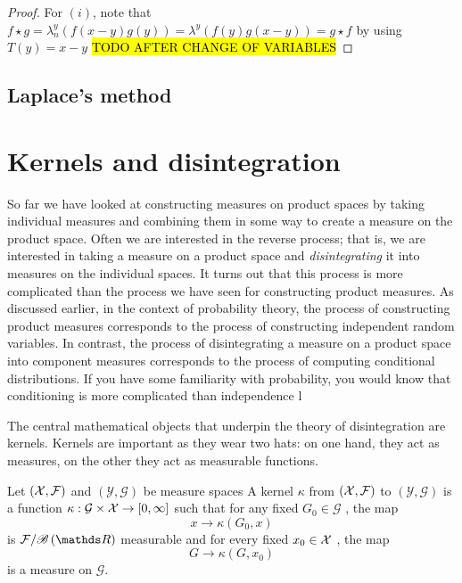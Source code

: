 \begin{proof}
For $\left(i\right)$, note that $f\star g=\lambda_{n}^{y}\left(f\left(x-y\right)g\left(y\right)\right)=\lambda^{y}\left(f\left(y\right)g\left(x-y\right)\right)=g\star f$
by using $T\left(y\right)=x-y$ \hl{TODO AFTER CHANGE OF VARIABLES}
\end{proof}
\begin{prop}
\label{prop:derivativeConvolution}
\end{prop}

\subsection{Laplace's method}

\begin{thm}
\label{thm:laplaceMethod}

\end{thm}



\section{Kernels and disintegration}

So far we have looked at constructing measures on product spaces by
taking individual measures and combining them in some way to create
a measure on the product space. Often we are interested in the reverse
process; that is, we are interested in taking a measure on a product
space and \emph{disintegrating }it into measures on the individual
spaces. It turns out that this process is more complicated than the
process we have seen for constructing product measures. As discussed
earlier, in the context of probability theory, the process of constructing
product measures corresponds to the process of constructing independent
random variables. In contrast, the process of disintegrating a measure
on a product space into component measures corresponds to the process
of computing conditional distributions. If you have some familiarity
with probability, you would know that conditioning is more complicated
than independence l

The central mathematical objects that underpin the theory of disintegration
are kernels. Kernels are important as they wear two hats: on one hand,
they act as measures, on the other they act as measurable functions.
\begin{defn}
\label{def:kernel}Let $\left(\mathcal{X},\mathcal{F}\right)$ and $\left(\mathcal{Y},\mathcal{G}\right)$
be measure spaces A kernel $\kappa$ from $\left(\mathcal{X},\mathcal{F}\right)$ to
$\left(\mathcal{Y},\mathcal{G}\right)$ is a function $\kappa:\mathcal{G}\times\mathcal{X}\to\left[0,\infty\right]$
such that for any fixed $G_{0}\in\mathcal{G}$ , the map
\[
x\to\kappa\left(G_{0},x\right)
\]
is $\F/\borel\left(\R\right)$ measurable and for every fixed $x_{0}\in\mathcal{X}$
, the map 
\[
G\to\kappa\left(G,x_{0}\right)
\]
is a measure on $\mathcal{G}.$
\end{defn}

